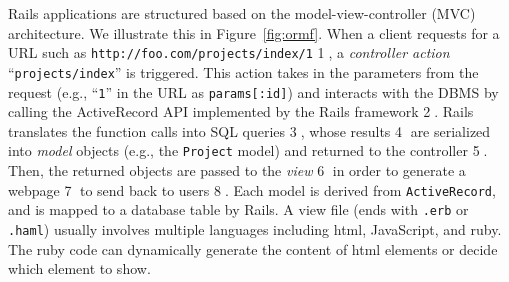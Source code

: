 \label{sec:bg}

Rails applications are structured based on the model-view-controller (MVC) architecture. We illustrate this in Figure~\ref{fig:ormf}. When a client requests for a URL such as {\tt http://foo.com/projects/index/1} {\large \textcircled{\small 1}}, a {\it controller action} ``{\tt projects/index}'' is triggered. This action takes in the parameters from the request (e.g., ``{\tt 1}'' in the URL as {\tt params[:id]}) and interacts with the DBMS by calling the ActiveRecord API implemented by the Rails framework {\large \textcircled{\small 2}}. Rails translates the function calls into SQL queries {\large \textcircled{\small 3}}, whose results {\large \textcircled{\small 4}} are serialized into {\it model} objects (e.g., the {\tt Project} model) and returned to the controller {\large \textcircled{\small 5}}. Then, the returned objects are passed to the {\it view} {\large \textcircled{\small 6}} in order to generate a webpage {\large \textcircled{\small 7}} to send back to users {\large \textcircled{\small 8}}. Each model is derived from {\tt ActiveRecord}, and is mapped to a database table by Rails. %
A view file (ends with {\tt .erb} or {\tt .haml}) usually involves multiple languages including html, JavaScript, and ruby. The ruby code can dynamically generate the content of html elements or decide which element to show. 

